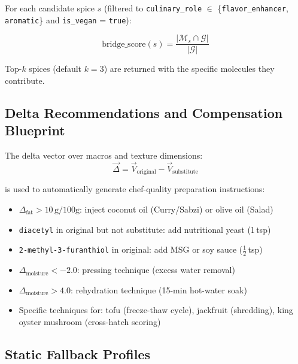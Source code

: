 \documentclass[12pt, a4paper]{article}
\begin{document}
For each candidate spice $s$ (filtered to \texttt{culinary\_role} $\in$ \{\texttt{flavor\_enhancer}, \texttt{aromatic}\} and \texttt{is\_vegan} = \texttt{true}):

\begin{equation}
\text{bridge\_score}(s) = \frac{|\mathcal{M}_s \cap \mathcal{G}|}{|\mathcal{G}|}
\label{eq:bridge}
\end{equation}

Top-$k$ spices (default $k=3$) are returned with the specific molecules they contribute.

\subsection{Delta Recommendations and Compensation Blueprint}
\label{sec:delta}

The delta vector over macros and texture dimensions:
\begin{equation}
\vec{\Delta} = \vec{V}_{\text{original}} - \vec{V}_{\text{substitute}}
\label{eq:delta}
\end{equation}

\noindent is used to automatically generate chef-quality preparation instructions:

\begin{itemize}
  \item $\Delta_{\text{fat}} > 10\,\text{g/100g}$: inject coconut oil (Curry/Sabzi) or olive oil (Salad)
  \item \texttt{diacetyl} in original but not substitute: add nutritional yeast (1\,tsp)
  \item \texttt{2-methyl-3-furanthiol} in original: add MSG or soy sauce ($\frac{1}{2}$\,tsp)
  \item $\Delta_{\text{moisture}} < -2.0$: pressing technique (excess water removal)
  \item $\Delta_{\text{moisture}} > 4.0$: rehydration technique (15-min hot-water soak)
  \item Specific techniques for: tofu (freeze-thaw cycle), jackfruit (shredding), king oyster mushroom (cross-hatch scoring)
\end{itemize}

\subsection{Static Fallback Profiles}
\end{document}
